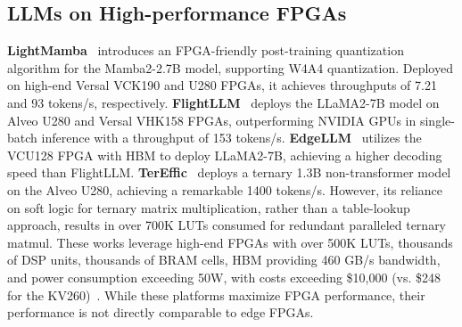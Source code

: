 \documentclass[sigconf]{acmart}
\begin{document}




\subsection{LLMs on High-performance FPGAs}
\textbf{LightMamba}~\cite{LightMamba} introduces an FPGA-friendly post-training quantization algorithm for the Mamba2-2.7B model, supporting W4A4 quantization. Deployed on high-end Versal VCK190 and U280 FPGAs, it achieves throughputs of 7.21 and 93 tokens/s, respectively.
\textbf{FlightLLM}~\cite{FlightLLM} deploys the LLaMA2-7B model on Alveo U280 and Versal VHK158 FPGAs, outperforming NVIDIA GPUs in single-batch inference with a throughput of 153 tokens/s.
\textbf{EdgeLLM}~\cite{EdgeLLM} utilizes the VCU128 FPGA with HBM to deploy LLaMA2-7B, achieving a higher decoding speed than FlightLLM.
\textbf{TerEffic}~\cite{yin2025tereffic} deploys a ternary 1.3B non-transformer model on the Alveo U280, achieving a remarkable 1400 tokens/s. However, its reliance on soft logic for ternary matrix multiplication, rather than a table-lookup approach, results in over 700K LUTs consumed for redundant paralleled ternary matmul.
These works leverage high-end FPGAs with over 500K LUTs, thousands of DSP units, thousands of BRAM cells, HBM providing 460 GB/s bandwidth, and power consumption exceeding 50W, with costs exceeding \$10,000 (vs. \$248 for the KV260)~\cite{AMDVersalOverview}. While these platforms maximize FPGA performance, their performance is not directly comparable to edge FPGAs.
\end{document}
